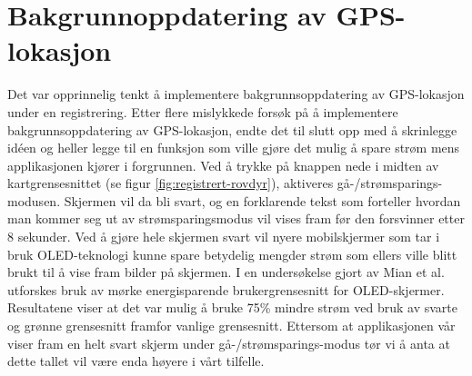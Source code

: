 \section{Bakgrunnoppdatering av GPS-lokasjon} \label{sec:bakgrunnsoppdatering-av-gps-lokasjon}
Det var opprinnelig tenkt å implementere bakgrunnsoppdatering av GPS-lokasjon under en registrering. Etter flere mislykkede forsøk på å implementere bakgrunnsoppdatering av GPS-lokasjon, endte det til slutt opp med å skrinlegge idéen og heller legge til en funksjon som ville gjøre det mulig å spare strøm mens applikasjonen kjører i forgrunnen. Ved å trykke på knappen nede i midten av kartgrensesnittet (se figur \ref{fig:registrert-rovdyr}), aktiveres gå-/strømsparings-modusen. Skjermen vil da bli svart, og en forklarende tekst som forteller hvordan man kommer seg ut av strømsparingsmodus vil vises fram før den forsvinner etter 8 sekunder. Ved å gjøre hele skjermen svart vil nyere mobilskjermer som tar i bruk OLED-teknologi kunne spare betydelig mengder strøm som ellers ville blitt brukt til å vise fram bilder på skjermen. I en undersøkelse gjort av Mian et al. \cite{dongPowersavingColorTransformation2009} utforskes bruk av mørke energisparende brukergrensesnitt for OLED-skjermer. Resultatene viser at det var mulig å bruke 75\% mindre strøm ved bruk av svarte og grønne grensesnitt framfor vanlige grensesnitt. Ettersom at applikasjonen vår viser fram en helt svart skjerm under gå-/strømsparings-modus tør vi å anta at dette tallet vil være enda høyere i vårt tilfelle.
